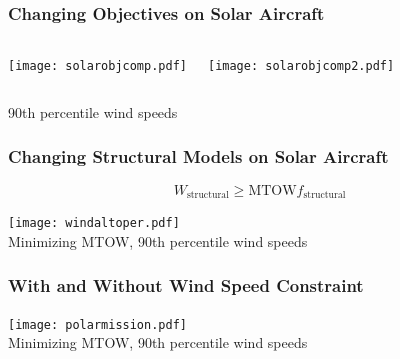 \documentclass{beamer}
\begin{document}
\begin{frame}
    \frametitle{Changing Objectives on Solar Aircraft}

    \begin{columns}
        \texttt{[image: solarobjcomp.pdf]}
        
        \texttt{[image: solarobjcomp2.pdf]}
    \end{columns}
    \begin{center}
        90th percentile wind speeds
    \end{center}

\end{frame}

\begin{frame}
    \frametitle{Changing Structural Models on Solar Aircraft}

    \[ W_{\text{structural}} \geq \text{MTOW} f_{\text{structural}} \]

    \begin{center}
    \texttt{[image: windaltoper.pdf]} \\
    Minimizing MTOW, 90th percentile wind speeds
    \end{center}

\end{frame}

\begin{frame}
    \frametitle{With and Without Wind Speed Constraint}

    \begin{center}
    \texttt{[image: polarmission.pdf]} \\
    Minimizing MTOW, 90th percentile wind speeds
    \end{center}

\end{frame}
\end{document}
